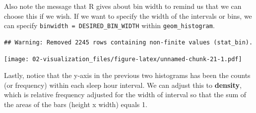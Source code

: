 \documentclass[
]{book}
\newenvironment{Shaded}{\begin{snugshade}}{\end{snugshade}}
\newcommand{\DataTypeTok}[1]{\textcolor[rgb]{0.13,0.29,0.53}{#1}}
\newcommand{\DecValTok}[1]{\textcolor[rgb]{0.00,0.00,0.81}{#1}}
\newcommand{\FloatTok}[1]{\textcolor[rgb]{0.00,0.00,0.81}{#1}}
\newcommand{\KeywordTok}[1]{\textcolor[rgb]{0.13,0.29,0.53}{\textbf{#1}}}
\newcommand{\NormalTok}[1]{#1}
\newcommand{\OperatorTok}[1]{\textcolor[rgb]{0.81,0.36,0.00}{\textbf{#1}}}
\newcommand{\StringTok}[1]{\textcolor[rgb]{0.31,0.60,0.02}{#1}}
\begin{document}
Also note the message that R gives about bin width to remind us that we can choose this if we wish. If we want to specify the width of the intervals or bins, we can specify \texttt{binwidth\ =\ DESIRED\_BIN\_WIDTH} within \texttt{geom\_histogram}.

\begin{Shaded}
\end{Shaded}

\begin{verbatim}
## Warning: Removed 2245 rows containing non-finite values (stat_bin).
\end{verbatim}

\texttt{[image: 02-visualization\_files/figure-latex/unnamed-chunk-21-1.pdf]}

Lastly, notice that the y-axis in the previous two histograms has been the counts (or frequency) within each sleep hour interval. We can adjust this to \textbf{density}, which is relative frequency adjusted for the width of interval so that the sum of the areas of the bars (height x width) equals 1.

\begin{Shaded}
\end{Shaded}
\end{document}
